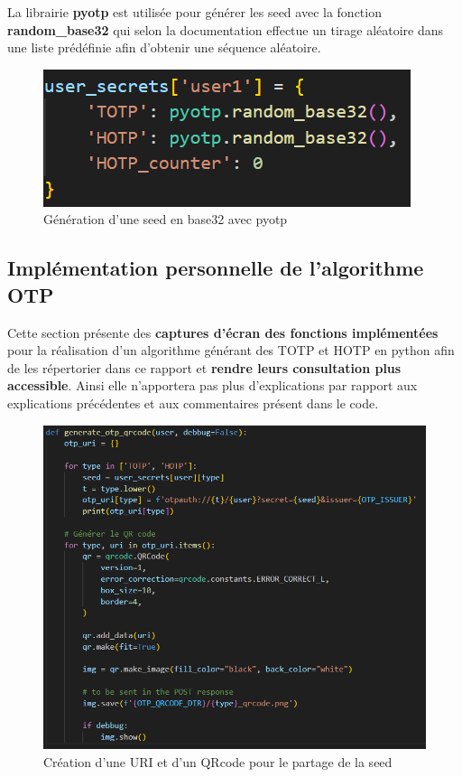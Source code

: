 \documentclass[a4paper, 10pt]{article}
\newcommand{\otp}{\textsc{OTP} }
\newcommand{\totp}{\textsc{TOTP} }
\newcommand{\hotp}{\textsc{HOTP} }
\begin{document}
La librairie \textbf{pyotp} est utilisée pour générer les seed avec la fonction \textbf{random\_base32} qui selon la documentation effectue un tirage aléatoire dans une liste prédéfinie afin d'obtenir une séquence aléatoire.

\begin{figure}[H]
        \centering
        \includegraphics[scale=1]{img/C_proto/code/code_pyotp_seed.png}
        \caption{Génération d'une seed en base32 avec pyotp\\}
        \label{fig:code-seed}
\end{figure}

    
    \subsection{Implémentation personnelle de l'algorithme \otp}

Cette section présente des \textbf{captures d'écran des fonctions implémentées} pour la réalisation d'un algorithme générant des \totp et \hotp en python afin de les répertorier dans ce rapport et \textbf{rendre leurs consultation plus accessible}. Ainsi elle n'apportera pas plus d'explications par rapport aux explications précédentes et aux commentaires présent dans le code.


\begin{figure}[H]
        \centering
        \includegraphics[scale=0.8]{img/C_proto/code/code_share_seed.png}
        \caption{Création d'une URI et d'un QRcode pour le partage de la seed\\}
        \label{fig:code-round-time}
\end{figure}
\end{document}

